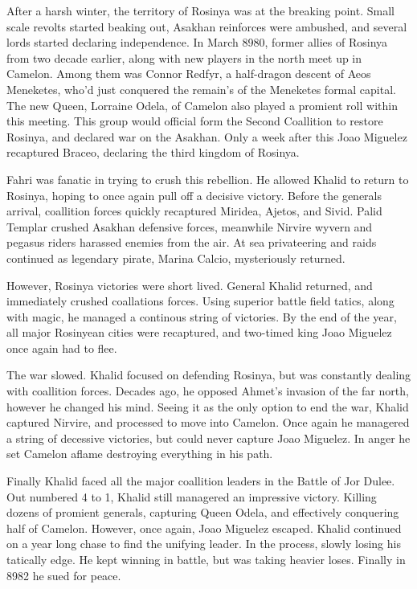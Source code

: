 \documentclass[../main.tex]{subfiles}
\begin{document}
After a harsh winter, the territory of Rosinya was at the breaking point. Small scale revolts started beaking out,
Asakhan reinforces were ambushed, and several lords started declaring independence. In March 8980, former allies 
of Rosinya from two decade earlier, along with new players in the north meet up in Camelon. Among them was Connor 
Redfyr, a half-dragon descent of Aeos Meneketes, who'd just conquered the remain's of the Meneketes formal capital.
The new Queen, Lorraine Odela, of Camelon also played a promient roll within this meeting. This group would official
form the Second Coallition to restore Rosinya, and declared war on the Asakhan. Only a week after this Joao Miguelez 
recaptured Braceo, declaring the third kingdom of Rosinya. 

Fahri was fanatic in trying to crush this rebellion. He allowed Khalid to return to Rosinya, hoping to once again 
pull off a decisive victory. Before the generals arrival, coallition forces quickly recaptured Miridea, Ajetos, and
Sivid. Palid Templar crushed Asakhan defensive forces, meanwhile Nirvire wyvern and pegasus riders harassed enemies 
from the air. At sea privateering and raids continued as legendary pirate, Marina Calcio, mysteriously returned.

However, Rosinya victories were short lived. General Khalid returned, and immediately crushed coallations forces. 
Using superior battle field tatics, along with magic, he managed a continous string of victories. By the end of 
the year, all major Rosinyean cities were recaptured, and two-timed king Joao Miguelez once again had to flee. 

The war slowed. Khalid focused on defending Rosinya, but was constantly dealing with coallition forces. Decades ago, 
he opposed Ahmet's invasion of the far north, however he changed his mind. Seeing it as the only option to end the war,
Khalid captured Nirvire, and processed to move into Camelon. Once again he managered a string of decessive victories,
but could never capture Joao Miguelez. In anger he set Camelon aflame destroying everything in his path. 

Finally Khalid faced all the major coallition leaders in the Battle of Jor Dulee. Out numbered 4 to 1, 
Khalid still managered an impressive victory. Killing dozens of promient generals, capturing Queen Odela, and
effectively conquering half of Camelon. However, once again, Joao Miguelez escaped. Khalid continued on a year 
long chase to find the unifying leader. In the process, slowly losing his tatically edge. He kept winning in 
battle, but was taking heavier loses. Finally in 8982 he sued for peace.
\end{document}
